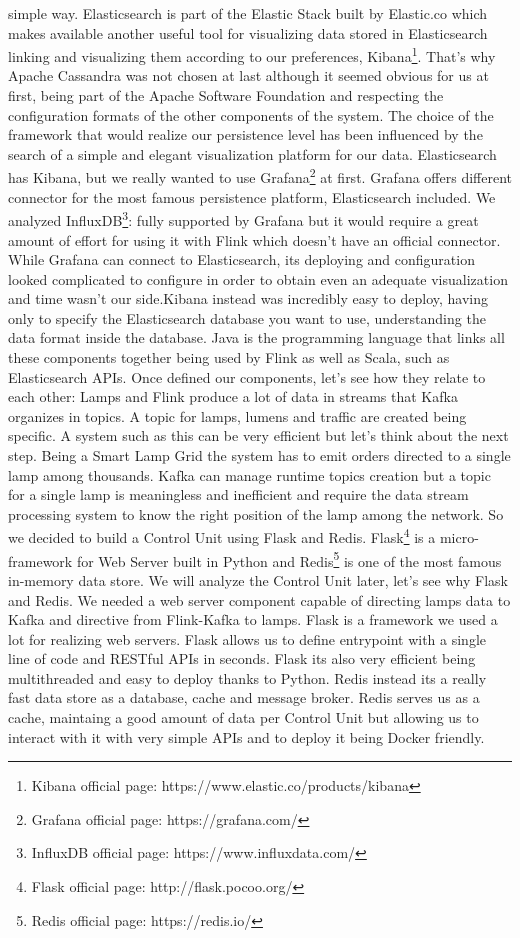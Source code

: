 simple way. Elasticsearch is part of the Elastic Stack built by Elastic.co which makes available another useful tool for visualizing data stored in Elasticsearch linking and visualizing them according to our preferences, Kibana\footnote{Kibana official page: https://www.elastic.co/products/kibana}. That's why Apache Cassandra was not chosen at last although it seemed obvious for us at first, being part of the Apache Software Foundation and respecting the configuration formats of the other components of the system.
The choice of the framework that would realize our persistence level has been influenced by the search of a simple and elegant visualization platform for our data. Elasticsearch has Kibana, but we really wanted to use Grafana\footnote{Grafana official page: https://grafana.com/} at first. Grafana offers different connector for the most famous persistence platform, Elasticsearch included. We analyzed InfluxDB\footnote{InfluxDB official page: https://www.influxdata.com/}: fully supported by Grafana but it would require a great amount of effort for using it with Flink which doesn't have an official connector. While Grafana can connect to Elasticsearch, its deploying and configuration looked complicated to configure in order to obtain even an adequate visualization and time wasn't our side.Kibana instead was incredibly easy to deploy, having only to specify the Elasticsearch database you want to use, understanding the data format inside the database. 
Java is the programming language that links all these components together being used by Flink as well as Scala, such as Elasticsearch APIs. 
Once defined our components, let’s see how they relate to each other: Lamps and Flink produce a lot of data in streams that Kafka organizes in topics. A topic for lamps, lumens and traffic are created being specific. A system such as this can be very efficient but let’s think about the next step. Being a Smart Lamp Grid the system has to emit orders directed to a single lamp among thousands. Kafka can manage runtime topics creation but a topic for a single lamp is meaningless and inefficient and require the data stream processing system to know the right position of the lamp among the network. So we decided to build a Control Unit using Flask and Redis. Flask\footnote{Flask official page: http://flask.pocoo.org/} is a micro-framework for Web Server built in Python and Redis\footnote{Redis official page: https://redis.io/} is one of the most famous in-memory data store. We will analyze the Control Unit later, let's see why Flask and Redis. We needed a web server component capable of directing lamps data to Kafka and directive from Flink-Kafka to lamps. Flask is a framework we used a lot for realizing web servers. Flask allows us to define entrypoint with a single line of code and RESTful APIs in seconds. Flask its also very efficient being multithreaded and easy to deploy thanks to Python. Redis instead its a really fast data store as a database, cache and message broker. Redis serves us as a cache, maintaing a good amount of data per Control Unit but allowing us to interact with it with very simple APIs and to deploy it being Docker friendly.

